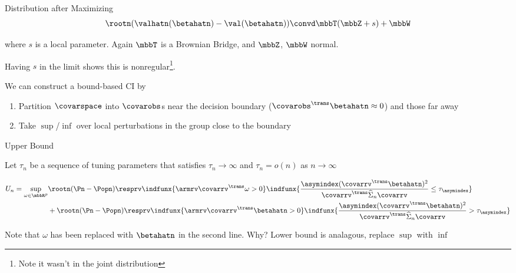 \documentclass[aspectratio=169, professionalfonts, handout]{beamer}
\begin{document}
\begin{frame}{Distribution after Maximizing}
	\begin{displaymath}
		\rootn (\valhatn (\betahatn) - \val(\betahatn)) \convd \mbbT(\mbbZ + s)
		+ \mbbW
	\end{displaymath}

	where $s$ is a local parameter. Again $\mbbT$ is a Brownian Bridge, and $\mbbZ$, $\mbbW$ normal.

	\vfill \pause
	Having $s$ in the limit shows this is nonregular\footnote{Note it wasn't in the
		joint distribution}.

	\vfill \pause
	We can construct a bound-based CI by
	\begin{enumerate}
		\item Partition $\covarspace$ into $\covarobs$s near the decision boundary
		      ($\covarobs^{\trans}\betahatn \approx 0$) and those far away
		      \vfill

		\item Take $\sup$/$\inf$ over local perturbations in the group close
		      to the boundary
	\end{enumerate}
	\vfill

\end{frame}
\begin{frame}{Upper Bound}
	\vfill

	Let $\tau_n$ be a sequence of tuning parameters that satisfies $\tau_n \to \infty$ and
	$\tau_n = o(n)$ as $n \to \infty$
	\vfill
	\large

	\begin{align*}
		U_n  = \sup_{\omega \in \mbbR^p} & \rootn(\Pn - \Popn)\resprv \indfunx{\armrv
			\covarrv^{\trans}\omega >
			0}\indfunx{\frac{\asymindex(\covarrv^{\trans}\betahatn)^2}{\covarrv^{\trans}\widehat{\Sigma}_n
		\covarrv} \leq \tau_{\asymindex}}                                               \\
		                                 & + \rootn(\Pn - \Popn)\resprv \indfunx{\armrv
			\covarrv^{\trans}\betahatn >
			0}\indfunx{\frac{\asymindex(\covarrv^{\trans}\betahatn)^2}{\covarrv^{\trans}\widehat{\Sigma}_n
				\covarrv} > \tau_{\asymindex}}
	\end{align*}
	\normalsize
	\vfill \pause

	Note that $\omega$ has been replaced with $\betahatn$ in the second line. Why?
	\vfill \pause
	Lower bound is analagous, replace $\sup$ with $\inf$
\end{frame}
\end{document}
